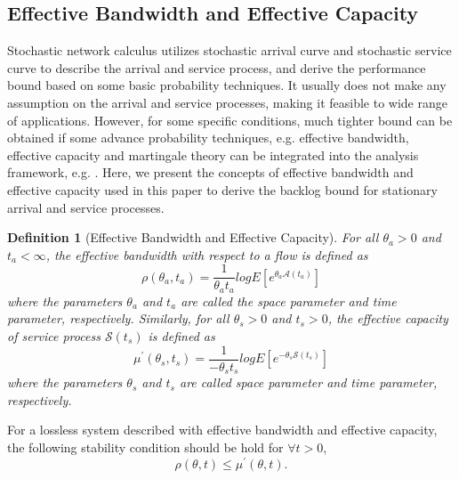 \documentclass[paper]{ieice}
\newtheorem{definition}{Definition}
\begin{document}
\subsection{Effective Bandwidth and Effective Capacity}\label{effectivebandcap}
Stochastic network calculus utilizes stochastic arrival curve and stochastic service curve to describe the arrival and service process, and derive the performance bound based on some basic probability techniques. It usually does not make any assumption on the arrival and service processes, making it feasible to wide range of applications. However, for some specific conditions, much tighter bound can be obtained if some advance probability techniques, e.g. effective bandwidth, effective capacity and martingale theory can be integrated into the analysis framework, e.g. \cite{Li2007Network,5984844,jiang2009network,Ciucu2007Network}. Here, we present the concepts of effective bandwidth \cite{Kelly1996Note} and effective capacity \cite{Wu2003Effective} used in this paper to derive the backlog bound for stationary arrival and service processes.
\begin{definition}[Effective Bandwidth and Effective Capacity]
For all $\theta_a>0$ and $t_a<\infty$, the effective bandwidth with respect to a flow is defined as
$$\rho(\theta_a,t_a)=\frac{1}{\theta_a t_a}log E[e^{\theta_a \mathcal{A}(t_a)}]$$
where the parameters $\theta_a$ and $t_a$ are called the space parameter and time parameter, respectively. Similarly, for all $\theta_s>0$ and $t_s>0$, the effective capacity of service process $\mathcal{S}(t_s)$ is defined as
$$\mu^\prime(\theta_s,t_s)=\frac{1}{-\theta_s t_s}log E[e^{-\theta_s \mathcal{S}(t_s)}]$$
where the parameters $\theta_s$ and $t_s$ are called space parameter and time parameter, respectively.
\end{definition}

For a lossless system described with effective bandwidth and effective capacity, the following stability condition should be hold for $\forall t>0$,
$$\rho(\theta,t)\leq \mu^\prime(\theta,t).$$
\end{document}
